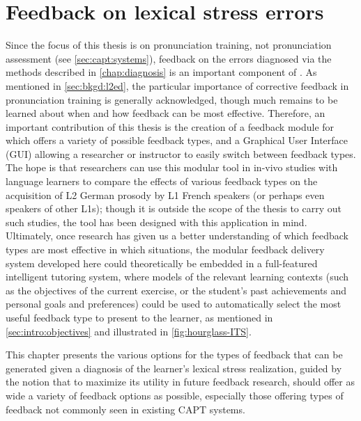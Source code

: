 %
%
\chapter{Feedback on lexical stress errors}
\label{chap:feedback}


Since the focus of this thesis is on pronunciation training, not pronunciation assessment (see \cref{sec:capt:systems}), feedback on the errors diagnosed via the methods described in \cref{chap:diagnosis} is an important component of . As mentioned in \cref{sec:bkgd:l2ed}, the particular importance of corrective feedback in pronunciation training is generally acknowledged,
though much remains to be learned about when and how feedback can be most effective. Therefore, an important contribution of this thesis is the creation of a feedback module for  which offers a variety of possible feedback types, and a Graphical User Interface (GUI) allowing a researcher or instructor to easily switch between feedback types. The hope is that researchers can use this modular tool in in-vivo studies with language learners to compare the effects of various feedback types on the acquisition of L2 German prosody by L1 French speakers (or perhaps even speakers of other L1s); though it is outside the scope of the thesis to carry out 
such studies,
the tool has been designed 
with this application in mind.
Ultimately, once research has given us a better understanding of which feedback types are most effective in which situations, the modular feedback delivery system developed here could theoretically be embedded in a full-featured intelligent tutoring system, where models of the relevant learning contexts (such as  the objectives of the current exercise, or the student's past achievements and personal goals and preferences) could be used to automatically select the most useful feedback type to present to the learner, as mentioned in \cref{sec:intro:objectives} and illustrated in \cref{fig:hourglass-ITS}.

This chapter presents the various options for the types of feedback that can be generated given a diagnosis of the learner's lexical stress realization, 
guided by the notion that to maximize its utility in future feedback research,  should offer as wide a variety of feedback options as possible, especially those offering types of feedback not commonly seen in existing CAPT systems. 

